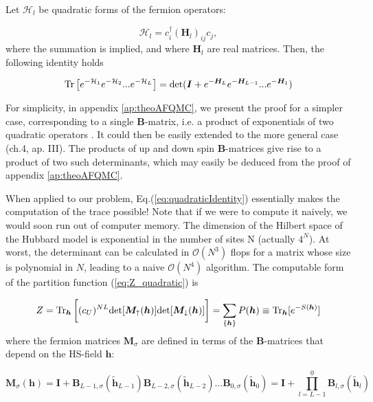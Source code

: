 Let $\mathcal{H}_l$ be quadratic forms of the fermion operators:

\begin{equation}
\mathcal{H}_l = c_i^\dagger (\bm H_l)_{ij} c_j,
\end{equation}
where the summation is implied, and where $\bm H_l$ are real matrices.
Then, the following identity holds

\begin{equation}\label{eq:quadraticIdentity}
\operatorname{Tr} \big[ e^{-\mathcal{H}_1 } e^{-\mathcal{H}_2 } ... e^{-\mathcal{H}_L } \big] = \text{det} ( \bm I + e^{-\bm H_L} e^{-\bm H_{L-1}} ... e^{-\bm H_1} )
\end{equation}

For simplicity, in appendix \ref{ap:theoAFQMC}, we present the proof for a simpler case, corresponding to a single $\bm B$-matrix, i.e. a product of exponentials of two quadratic operators \cite{hirsch_two-dimensional_1985}.
It could then be easily extended to the more general case \cite{hanke_electronic_nodate}(ch.4, ap. III).
The products of up and down spin $\bm B$-matrices give rise to a product of two such determinants, which may easily be deduced from the proof of appendix \ref{ap:theoAFQMC}.

When applied to our problem, Eq.(\ref{eq:quadraticIdentity}) essentially makes the computation of the trace possible! Note that if we were to compute it naively, we would soon run out of computer memory.
The dimension of the Hilbert space of the Hubbard model is exponential in the number of sites N (actually $4^N$).
At worst, the determinant can be calculated in $\mathcal{O}(N^3)$ flops for a matrix whose size is polynomial in $N$, leading to a naive $\mathcal{O}(N^4)$ algorithm.
The computable form of the partition function (\ref{eq:Z_quadratic}) is

\begin{equation}\label{eq:effectiveDensityMatrix}
Z =  \operatorname{Tr}_{\bm h} \bigg[ (c_U)^{NL} \text{det} [ \bm M_\uparrow (\bm h)] \text{det} [  \bm M_\downarrow (\bm h) ] \bigg] = \sum_{\{ \bm h \} } P ( \bm h ) \equiv \operatorname{Tr}_{\bm h} [ e^{-S(\bm h) } ]
\end{equation}
where the fermion matrices $\bm M_\sigma$ are defined in terms of the $\bm B$-matrices that depend on the HS-field $\bm h$:

\begin{equation}
\bm M_\sigma (\bm h) = \bm I + \bm B_{L-1,\sigma} ( \widetilde{\bm h}_{L-1}) \bm B_{L-2,\sigma} ( \widetilde{\bm h}_{L-2}) ... \bm B_{0,\sigma} ( \widetilde{\bm h}_0) = \bm I + \prod_{l= L -1}^0 \bm B_{l,\sigma} ( \widetilde{\bm h}_l )
\end{equation}

